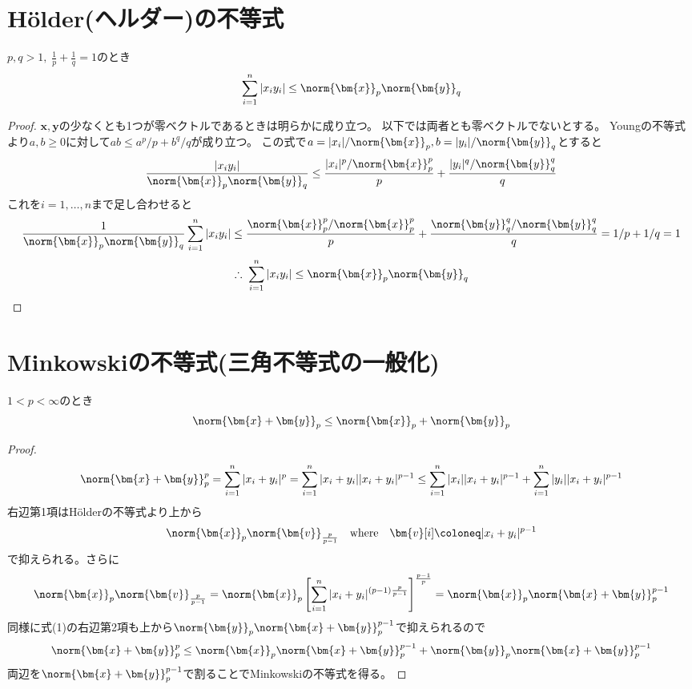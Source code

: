     \section{H\"older(ヘルダー)の不等式}
        \begin{shadebox}
            $p,q>1,\;\frac{1}{p}+\frac{1}{q}=1$のとき
            \[\sum_{i=1}^n|x_iy_i|\leq\norm{\bm{x}}_p\norm{\bm{y}}_q\]
        \end{shadebox}
        \begin{proof}
            \quad\par
            $\bm{x},\bm{y}$の少なくとも1つが零ベクトルであるときは明らかに成り立つ。
            以下では両者とも零ベクトルでないとする。
            Youngの不等式より$a,b\geq 0$に対して$ab \leq a^p/p + b^q/q$が成り立つ。
            この式で$a=|x_i|/\norm{\bm{x}}_p,b=|y_i|/\norm{\bm{y}}_q$とすると
            \[\frac{|x_iy_i|}{\norm{\bm{x}}_p\norm{\bm{y}}_q}\leq\frac{|x_i|^p/\norm{\bm{x}}_p^p}{p}+\frac{|y_i|^q/\norm{\bm{y}}_q^q}{q}\]
            これを$i=1,\dots,n$まで足し合わせると
            \[\frac{1}{\norm{\bm{x}}_p\norm{\bm{y}}_q}\sum_{i=1}^n{|x_iy_i|} \leq \frac{\norm{\bm{x}}_p^p/\norm{\bm{x}}_p^p}{p}+\frac{\norm{\bm{y}}_q^q/\norm{\bm{y}}_q^q}{q} = 1/p+1/q = 1\]
            \[\therefore\;\sum_{i=1}^n|x_iy_i|\leq\norm{\bm{x}}_p\norm{\bm{y}}_q\]
        \end{proof}
    \section{Minkowskiの不等式(三角不等式の一般化)}
        \begin{shadebox}
            $1<p<\infty$のとき
            \[\norm{\bm{x}+\bm{y}}_p \leq \norm{\bm{x}}_p+\norm{\bm{y}}_p\]
        \end{shadebox}
        \begin{proof}
            \begin{equation}
                \norm{\bm{x}+\bm{y}}_p^p = \sum_{i=1}^n{|x_i+y_i|^p} = \sum_{i=1}^n{|x_i+y_i||x_i+y_i|^{p-1}} \leq \sum_{i=1}^n{|x_i||x_i+y_i|^{p-1}}+\sum_{i=1}^n{|y_i||x_i+y_i|^{p-1}}
            \end{equation}
            右辺第1項はH\"olderの不等式より上から
            \[\norm{\bm{x}}_p\norm{\bm{v}}_{\frac{p}{p-1}}\quad\mathrm{where}\quad\bm{v}[i]\coloneq|x_i+y_i|^{p-1}\]
            で抑えられる。さらに
            \[\norm{\bm{x}}_p\norm{\bm{v}}_{\frac{p}{p-1}} = \norm{\bm{x}}_p\left[\sum_{i=1}^n{|x_i+y_i|^{(p-1)\frac{p}{p-1}}}\right]^{\frac{p-1}{p}} = \norm{\bm{x}}_p\norm{\bm{x}+\bm{y}}_p^{p-1}\]
            同様に式(1)の右辺第2項も上から$\norm{\bm{y}}_p\norm{\bm{x}+\bm{y}}_p^{p-1}$で抑えられるので
            \[\norm{\bm{x}+\bm{y}}_p^p \leq \norm{\bm{x}}_p\norm{\bm{x}+\bm{y}}_p^{p-1} + \norm{\bm{y}}_p\norm{\bm{x}+\bm{y}}_p^{p-1}\]
            両辺を$\norm{\bm{x}+\bm{y}}_p^{p-1}$で割ることでMinkowskiの不等式を得る。
        \end{proof}